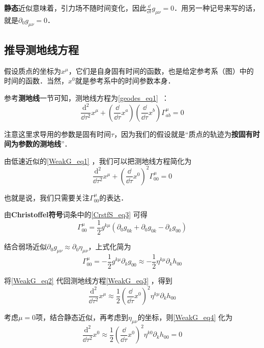 \textbf{静态}近似意味着，引力场不随时间变化，因此$\frac{\dd}{\dd t}g_{\mu\nu}=0$．用另一种记号来写的话，就是$\partial_0g_{\mu\nu}=0$．

\subsection{推导测地线方程}

假设质点的坐标为$x^\mu$，它们是自身固有时间的函数，也是给定参考系（图）中的时间的函数．当然，$x^0$就是参考系中的时间参数本身．

参考\textbf{测地线}一节可知，测地线方程为\autoref{geodes_eq1}~：
\begin{equation}
\frac{\mathrm{d}^2}{\dd\tau^2}x^\mu+(\frac{\dd}{\dd\tau}x^a)(\frac{\dd}{\dd\tau}x^b)\Gamma^\mu_{ab}=0
\end{equation}

注意这里求导用的参数是固有时间$\tau$，因为我们的假设就是“质点的轨迹为\textbf{按固有时间为参数的测地线}”．

由低速近似的\autoref{WeakG_eq1} ，我们可以把测地线方程简化为
\begin{equation}\label{WeakG_eq3}
\frac{\mathrm{d}^2}{\dd\tau^2}x^\mu+(\frac{\dd}{\dd\tau}x^0)^2\Gamma^\mu_{00}=0
\end{equation}

也就是说，我们只需要关注$\Gamma^\mu_{00}$的表达．

由\textbf{Christoffel符号}词条中的\autoref{CrstfS_eq3} 可得
\begin{equation}
\Gamma^\mu_{00}=\frac{1}{2}g^{k\mu}(\partial_0g_{0k}+\partial_0g_{0k}-\partial_{k}g_{00})
\end{equation}

结合弱场近似$\partial_0g_{\mu\nu}\approx\partial_0\eta_{\mu\nu}$，上式化简为
\begin{equation}\label{WeakG_eq2}
\Gamma^\mu_{00}=-\frac{1}{2}g^{k\mu}\partial_{k}g_{00}\approx-\frac{1}{2}\eta^{k\mu}\partial_{k}h_{00}
\end{equation}

将\autoref{WeakG_eq2} 代回测地线方程\autoref{WeakG_eq3} ，得到
\begin{equation}\label{WeakG_eq4}
\frac{\mathrm{d}^2}{\dd\tau^2}x^\mu\approx\frac{1}{2}(\frac{\dd}{\dd\tau}x^0)^2\eta^{k\mu}\partial_{k}h_{00}
\end{equation}

考虑$\mu=0$项，结合静态近似，再考虑到$\eta_{\mu\nu}$的坐标，则\autoref{WeakG_eq4} 化为
\begin{equation}
\frac{\mathrm{d}^2}{\dd\tau^2}x^0\approx\frac{1}{2}(\frac{\dd}{\dd\tau}x^0)^2\eta^{k0}\partial_{k}h_{00}=0
\end{equation}

